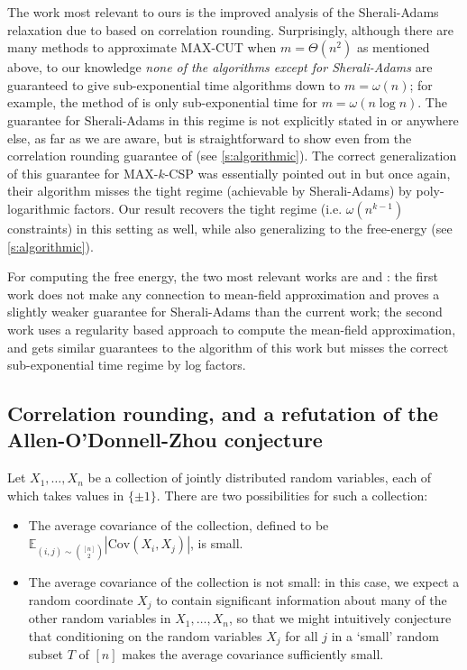\documentclass[11pt, oneside, english]{article}
\newcommand{\bE}{\mathbb{E}}
\newcommand{\Cov}{\mathrm{Cov}}
\newcommand{\E}{\bE}      %
\theoremstyle{definition}
\theoremstyle{plain}
\begin{document}
The work most relevant to ours is the improved analysis of the Sherali-Adams relaxation due to \cite{yoshida-zhou} based on correlation rounding. Surprisingly, although there are many methods to approximate MAX-CUT when $m = \Theta(n^2)$ as mentioned above, to our knowledge \emph{none of the algorithms except for Sherali-Adams} are guaranteed to give sub-exponential time algorithms down to $m = \omega(n)$; for example, the method of \cite{frieze-kannan-matrix} is only sub-exponential time for $m = \omega(n \log n)$. The guarantee for Sherali-Adams in this regime is not explicitly stated in \cite{yoshida-zhou} or anywhere else, as far as we are aware, but is straightforward to show even from the correlation rounding guarantee of \cite{raghavendra-tan} (see \cref{s:algorithmic}). The correct generalization of this guarantee for MAX-$k$-CSP was essentially pointed out in \cite{fotakis2015sub} but once again, their algorithm misses the tight regime (achievable by Sherali-Adams) by poly-logarithmic factors. Our result recovers the tight regime (i.e. $\omega(n^{k - 1})$ constraints) in this setting as well, while also generalizing to the free-energy (see \cref{s:algorithmic}).

For computing the free energy, the two most relevant works are \cite{risteski2016calculate} and \cite{jain2018mean}: the first work does not make any connection to mean-field approximation and proves a slightly weaker guarantee for Sherali-Adams than the current work; the second work uses a regularity based approach to compute the mean-field approximation, and gets similar guarantees to the algorithm of this work but misses the correct sub-exponential time regime by log factors.

\subsection{Correlation rounding, and a refutation of the Allen-O'Donnell-Zhou conjecture}


Let $X_1,\dots,X_n$ be a collection of jointly distributed random variables, each of which takes values in $\{\pm 1\}$. There are two possibilities for such a collection: 
\begin{itemize}
\item The average covariance of the collection, defined to be $\E_{(i,j)\sim {[n] \choose 2}}|\Cov(X_i,X_j)|$, is small.
\item The average covariance of the collection is not small: in this case, we expect a random coordinate $X_j$ to contain significant information about many of the other random variables in $X_1,\dots,X_n$, so that we might intuitively conjecture that conditioning on the random variables $X_j$ for all $j$ in a `small' random subset $T$ of $[n]$ makes the average covariance sufficiently small.
\end{itemize}
\end{document}
